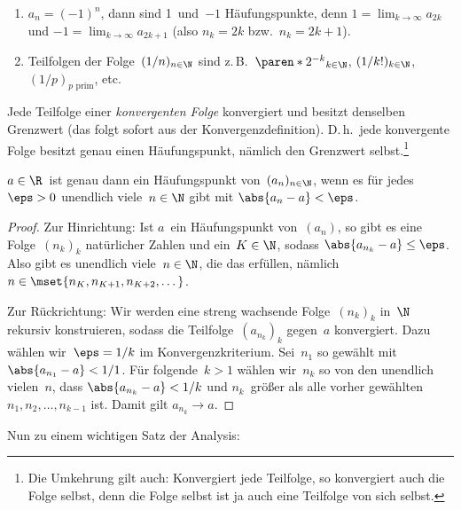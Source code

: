 \documentclass[a4paper]{article}
\begin{document}
\begin{example}\leavevmode
    \begin{enumerate}
        \item $a_n = (-1)^n$, dann sind 1~und~$-1$ Häufungspunkte, denn $1 = \lim_{k\to\infty} a_{2k}$ und $-1 = \lim_{k\to\infty} a_{2k+1}$ (also $n_k = 2k$ bzw.\ $n_k = 2k+1$).
        \item Teilfolgen der Folge~$(1/n)_{n\in\N}$ sind z.\,B.\ $\paren*{2^{-k}}_{k\in\N}$, $(1/k!)_{k\in\N}$, $(1/p)_{p\text{ prim}}$, etc.
    \end{enumerate}
\end{example}

\begin{remark}
    Jede Teilfolge einer \emph{konvergenten Folge} konvergiert und besitzt denselben Grenzwert (das folgt sofort aus der Konvergenzdefinition). D.\,h.\ jede konvergente Folge besitzt genau einen Häufungspunkt, nämlich den Grenzwert selbst.\footnote{Die Umkehrung gilt auch: Konvergiert jede Teilfolge, so konvergiert auch die Folge selbst, denn die Folge selbst ist ja auch eine Teilfolge von sich selbst.}
\end{remark}

\begin{lemma}
    $a \in \R$~ist genau dann ein Häufungspunkt von~$(a_n)_{n\in\N}$, wenn es für jedes~$\eps > 0$ unendlich viele~$n \in \N$ gibt mit $\abs{a_n-a} < \eps$.
\end{lemma}

\begin{proof}
    Zur Hinrichtung: Ist $a$~ein Häufungspunkt von~$(a_n)$, so gibt es eine Folge~$(n_k)_k$ natürlicher Zahlen und ein~$K \in \N$, sodass $\abs{a_{n_k}-a} \leq \eps$. Also gibt es unendlich viele~$n \in \N$, die das erfüllen, nämlich $n \in \mset{n_K, n_{K+1}, n_{K+2}, \dots}$.

    Zur Rückrichtung: Wir werden eine streng wachsende Folge~$(n_k)_k$ in~$\N$ rekursiv konstruieren, sodass die Teilfolge~$(a_{n_k})_k$ gegen~$a$ konvergiert. Dazu wählen wir~$\eps = 1/k$ im Konvergenzkriterium. Sei~$n_1$ so gewählt mit $\abs{a_{n_1}-a} < 1/1$. Für folgende~$k > 1$ wählen wir~$n_k$ so von den unendlich vielen~$n$, dass $\abs{a_{n_k}-a} < 1/k$ und $n_k$~größer als alle vorher gewählten $n_1, n_2, \dots, n_{k-1}$ ist. Damit gilt $a_{n_k} \to a$.
\end{proof}

Nun zu einem wichtigen Satz der Analysis:
\end{document}
